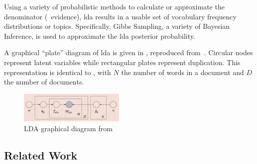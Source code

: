 
\noindent
Using a variety of probabilistic methods to calculate or approximate the denominator (\ie\ evidence), \ac{lda} results in a usable set of vocabulary frequency distributions or topics.
Specifically, Gibbs Sampling, a variety of Bayesian Inference, is used to approximate the \ac{lda} posterior probability.~\cite{Blei2003}


A graphical ``plate'' diagram of \ac{lda} is given in , reproduced from~\cite{Blei2003}.
Circular nodes represent latent variables while rectangular plates represent duplication.
This representation is identical to , with $N$ the number of words in a document and $D$ the number of documents.


\begin{figure}
  \includegraphics[width=0.45\textwidth]{figures/lda-plates}
  \caption{LDA graphical diagram from~\cite{Blei2012}\label{fig:lda-plates}}
\end{figure}


\subsection{Related Work}
\label{sec:related-work}


